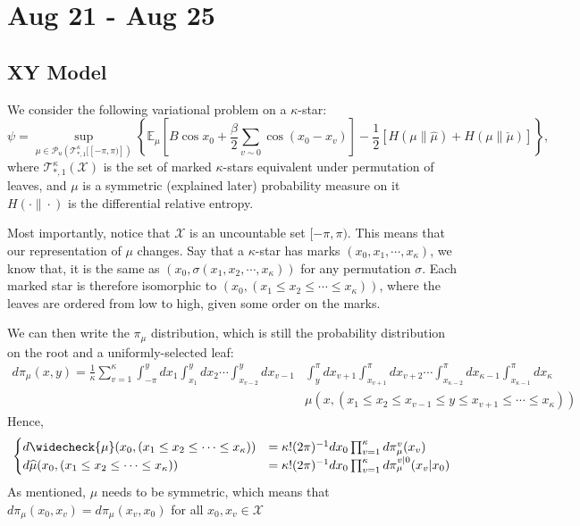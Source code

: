 \documentclass[12pt]{article}
\numberwithin{equation}{section}
\begin{document}
\newpage

\section{Aug 21 - Aug 25}

\subsection{XY Model}

We consider the following variational problem on a $\kappa$-star:
\begin{equation}
    \psi = \sup_{\mu\in\mathcal{P}_u(\mathcal{T}^\kappa_{*, 1}[[-\pi, \pi)])}
    \left\{\mathbb{E}_\mu\left[B\cos x_0+\frac\beta2\sum_{v\sim0}\cos(x_0-x_v)\right]-\frac12[H(\mu\|\hat{\mu})+H(\mu\|\check{\mu})]\right\},
    \label{Eq.XY-VP}
\end{equation}
where $\mathcal{T}^\kappa_{*, 1}(\mathcal{X})$ is the set of marked $\kappa$-stars equivalent under permutation of leaves, and $\mu$ is a symmetric
(explained later) probability measure on it $H(\cdot\|\cdot)$ is the differential relative entropy.

Most importantly, notice that $\mathcal{X}$ is an uncountable set $[-\pi, \pi)$. This means that our representation of $\mu$ changes. Say that a
$\kappa$-star has marks $(x_0, x_1, \cdots, x_\kappa)$, we know that, it is the same as $(x_0, \sigma(x_1, x_2, \cdots, x_\kappa))$ for any
permutation $\sigma$. Each marked star is therefore isomorphic to $(x_0, (x_1 \leq x_2 \leq \cdots \leq x_\kappa))$, where the leaves are ordered
from low to high, given some order on the marks.

We can then write the $\pi_\mu$ distribution, which is still the probability distribution on the root and a uniformly-selected leaf:
\begin{align*}
    d\pi_\mu(x, y) = \frac1\kappa\sum_{v=1}^\kappa \int_{-\pi}^y dx_1 \int_{x_1}^y dx_2 \cdots \int_{x_{v-2}}^y dx_{v-1}
     & \int_{y}^\pi dx_{v+1}\int_{x_{v+1}}^\pi dx_{v+2} \cdots \int_{x_{\kappa-2}}^\pi dx_{\kappa-1}\int_{x_{\kappa-1}}^\pi dx_{\kappa} \\
     & \mu(x, (x_1 \leq x_2 \leq x_{v-1} \leq y \leq x_{v+1}\leq \cdots \leq x_\kappa))
\end{align*}
Hence,
\begin{equation*}
    \begin{cases}
        d\widecheck{\mu}(x_0, (x_1 \leq x_2 \leq \cdots \leq x_\kappa)) & =  \kappa! (2\pi)^{-1} dx_0 \prod_{v=1}^\kappa d\pi_\mu^v(x_v)           \\
        d\widehat{\mu}(x_0, (x_1 \leq x_2 \leq \cdots \leq x_\kappa))   & =  \kappa! (2\pi)^{-1} dx_0 \prod_{v=1}^\kappa d\pi_\mu^{v|0}(x_v | x_0)
    \end{cases}
\end{equation*}
As mentioned, $\mu$ needs to be symmetric, which means that $d\pi_\mu(x_0, x_v) = d\pi_\mu(x_v, x_0)$ for all $x_0, x_v\in\mathcal{X}$
\end{document}

